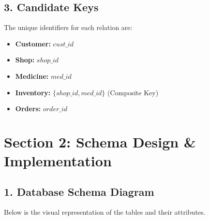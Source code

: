 \documentclass{article}
\begin{document}
\subsection{3. Candidate Keys}
The unique identifiers for each relation are:
\begin{itemize}
    \item \textbf{Customer:} $cust\_id$
    \item \textbf{Shop:} $shop\_id$
    \item \textbf{Medicine:} $med\_id$
    \item \textbf{Inventory:} $\{shop\_id, med\_id\}$ (Composite Key)
    \item \textbf{Orders:} $order\_id$
\end{itemize}

\newpage

\section{Section 2: Schema Design \& Implementation}

\subsection{1. Database Schema Diagram}
Below is the visual representation of the tables and their attributes.
\vspace{0.5cm}
\end{document}
